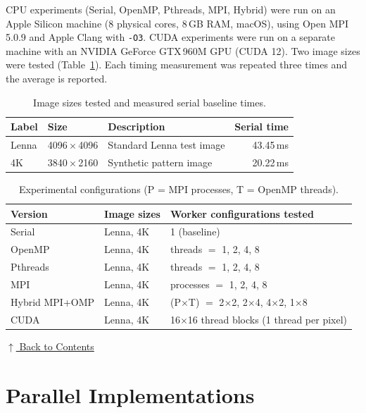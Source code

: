 \documentclass[12pt,a4paper]{article}
\begin{document}
CPU experiments (Serial, OpenMP, Pthreads, MPI, Hybrid) were run on an
Apple Silicon machine (8 physical cores, 8\,GB RAM, macOS), using Open MPI
5.0.9 and Apple Clang with \texttt{-O3}. CUDA experiments were run on a
separate machine with an NVIDIA GeForce GTX\,960M GPU (CUDA 12). Two image
sizes were tested (Table~\ref{tab:datasets}). Each timing measurement was
repeated three times and the average is reported.

\begin{table}[H]
\centering
\begin{tabular}{@{}lllr@{}}
\toprule
\textbf{Label} & \textbf{Size} & \textbf{Description} & \textbf{Serial time} \\
\midrule
Lenna & 4096\,$\times$\,4096 & Standard Lenna test image & 43.45\,ms \\
4K    & 3840\,$\times$\,2160 & Synthetic pattern image   & 20.22\,ms \\
\bottomrule
\end{tabular}
\caption{Image sizes tested and measured serial baseline times.}
\label{tab:datasets}
\end{table}

\begin{table}[H]
\centering\small
\begin{tabular}{@{}lll@{}}
\toprule
\textbf{Version} & \textbf{Image sizes} & \textbf{Worker configurations tested} \\
\midrule
Serial        & Lenna, 4K & 1 (baseline) \\
OpenMP        & Lenna, 4K & threads $=$ 1, 2, 4, 8 \\
Pthreads      & Lenna, 4K & threads $=$ 1, 2, 4, 8 \\
MPI           & Lenna, 4K & processes $=$ 1, 2, 4, 8 \\
Hybrid MPI+OMP & Lenna, 4K & (P$\times$T) $=$ 2$\times$2, 2$\times$4, 4$\times$2, 1$\times$8 \\
CUDA          & Lenna, 4K & 16$\times$16 thread blocks (1 thread per pixel) \\
\bottomrule
\end{tabular}
\caption{Experimental configurations (P = MPI processes, T = OpenMP threads).}
\label{tab:configs}
\end{table}

\hyperref[contents]{\small $\uparrow$ Back to Contents}

\clearpage
\section{Parallel Implementations}
\label{sec:impl}
\end{document}
